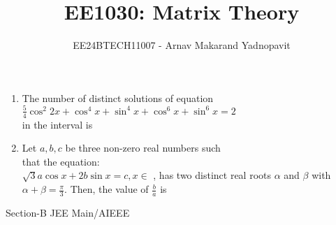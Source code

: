 \documentclass[journal,12pt,twocolumn]{IEEEtran}
\theoremstyle{remark}
\begin{document}

\vspace{3cm}

\title{EE1030: Matrix Theory}
\author{EE24BTECH11007 - Arnav Makarand Yadnopavit}
\maketitle
\newpage


\renewcommand{\thefigure}{\theenumi}
\renewcommand{\thetable}{\theenumi}

\begin{enumerate}[start=6]
\item The number of distinct solutions of equation
$\frac{5}{4}\cos^2 2x+\cos^4 x+\sin^4 x+\cos^6 x+\sin^6 x=2$
\\in the interval  is\hfill{} 
\item Let $a, b, c$ be three non-zero real numbers such
\\that the equation:
\\$\sqrt{3} a\cos x+2b\sin x = c,x\in$ 
, has two distinct real roots $\alpha$ and $\beta$ with $\alpha+\beta=\frac{\pi}{3}$. Then, the value of $\frac{b}{a}$ is
\hfill{}
\end{enumerate}
{\LARGE Section-B JEE Main/AIEEE}
\end{document}
